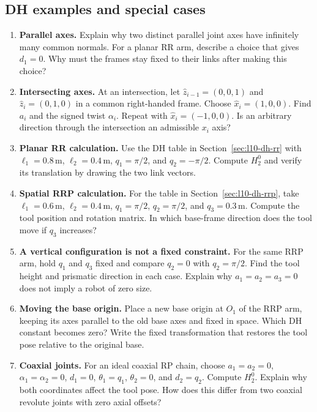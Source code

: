 \clearpage
\subsection{DH examples and special cases}
\begin{enumerate}
\item \textbf{Parallel axes.} Explain why two distinct parallel joint
axes have infinitely many common normals. For a planar RR arm, describe
a choice that gives $d_1=0$. Why must the frames stay fixed to their links
after making this choice?

\item \textbf{Intersecting axes.} At an intersection, let
$\hat z_{i-1}=(0,0,1)$ and $\hat z_i=(0,1,0)$ in a common right-handed
frame. Choose $\hat x_i=(1,0,0)$. Find $a_i$ and the signed twist
$\alpha_i$. Repeat with $\hat x_i=(-1,0,0)$. Is an arbitrary direction
through the intersection an admissible $x_i$ axis?

\item \textbf{Planar RR calculation.} Use the DH table in
Section~\ref{sec:l10-dh-rr} with $\ell_1=0.8\,\mathrm m$,
$\ell_2=0.4\,\mathrm m$, $q_1=\pi/2$, and $q_2=-\pi/2$.
Compute $H_2^0$ and verify its translation by drawing the two link vectors.

\item \textbf{Spatial RRP calculation.} For the table in
Section~\ref{sec:l10-dh-rrp}, take $\ell_1=0.6\,\mathrm m$,
$\ell_2=0.4\,\mathrm m$, $q_1=\pi/2$, $q_2=\pi/2$, and
$q_3=0.3\,\mathrm m$. Compute the tool position and rotation matrix.
In which base-frame direction does the tool move if $q_3$ increases?

\item \textbf{A vertical configuration is not a fixed constraint.}
For the same RRP arm, hold $q_1$ and $q_3$ fixed and compare $q_2=0$
with $q_2=\pi/2$. Find the tool height and prismatic direction in each
case. Explain why $a_1=a_2=a_3=0$ does not imply a robot of zero size.

\item \textbf{Moving the base origin.} Place a new base origin at $O_1$
of the RRP arm, keeping its axes parallel to the old base axes and fixed
in space. Which DH constant becomes zero? Write the fixed transformation
that restores the tool pose relative to the original base.

\item \textbf{Coaxial joints.} For an ideal coaxial RP chain, choose
$a_1=a_2=0$, $\alpha_1=\alpha_2=0$, $d_1=0$, $\theta_1=q_1$,
$\theta_2=0$, and $d_2=q_2$. Compute $H_2^0$. Explain why both coordinates
affect the tool pose. How does this differ from two coaxial revolute
joints with zero axial offsets?
\end{enumerate}
